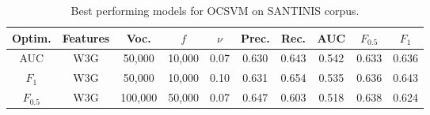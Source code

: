 
\begin{table}[t]
	\center
	\caption{Best performing models for OCSVM on SANTINIS corpus.}\label{chap:noise:tbl:OCSVME_SANTINIS}
	\begin{adjustbox}{width=\textwidth}
	\begin{tabular}{|c c c c c c c c c c|}
		\hline
		Optim. & Features & Voc. & $f$ & $\nu$ & Prec. & Rec. & AUC & $F_{0.5}$ & $F_{1}$ \\
		\hline
		AUC & W3G & 50,000 & 10,000 & 0.07 & 0.630 & 0.643 & 0.542 & 0.633 & 0.636 \\
		$F_{1}$ & W3G & 50,000 & 10,000 & 0.10 & 0.631 & 0.654 & 0.535 & 0.636 & 0.643 \\
		$F_{0.5}$ & W3G & 100,000 & 50,000 & 0.07 & 0.647 & 0.603 & 0.518 & 0.638 & 0.624\\
		\hline
	\end{tabular}
\end{adjustbox}	
\end{table}

% 
% 



